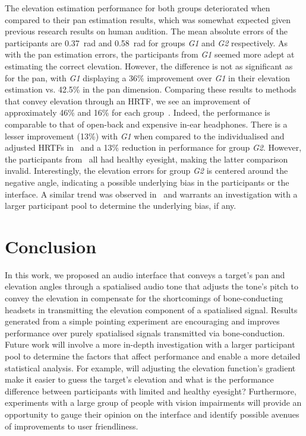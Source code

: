\documentclass{llncs}
\begin{document}
The elevation estimation performance for both groups deteriorated when compared to their pan estimation results, which was somewhat expected given previous research results on human audition. 
The mean absolute errors of the participants are \SI{0.37}{\radian} and \SI{0.58}{\radian} for groups \textit{G1} and \textit{G2} respectively.
As with the pan estimation errors, the participants from \textit{G1} seemed more adept at estimating the correct elevation.
However, the difference is not as significant as for the pan, with \textit{G1} displaying a 36\% improvement over \textit{G1} in their elevation estimation vs. 42.5\% in the pan dimension. 
Comparing these results to methods that convey elevation through an HRTF, we see an improvement of approximately 46\% and 16\% for each group~\cite{schonstein2008comparison}. 
Indeed, the performance is comparable to that of open-back and expensive in-ear headphones.
There is a lesser improvement (13\%) with \textit{G1} when compared to the individualised and adjusted HRTFs in~\cite{stanley2006lateralization} and a 13\% reduction in performance for group \textit{G2}.
However, the participants from~\cite{stanley2006lateralization} all had healthy eyesight, making the latter comparison invalid. 
Interestingly, the elevation errors for group \textit{G2} is centered around the negative angle, indicating a possible underlying bias in the participants or the interface.
A similar trend was observed in~\cite{stanley2006lateralization} and warrants an investigation with a larger participant pool to determine the underlying bias, if any. 

\section{Conclusion}\label{sec:conclusion}

In this work, we proposed an audio interface that conveys a target's pan and elevation angles through a spatialised audio tone that adjusts the tone's pitch to convey the elevation in compensate for the shortcomings of bone-conducting headsets in transmitting the elevation component of a spatialised signal.
Results generated from a simple pointing experiment are encouraging and improves performance over purely spatialised signals transmitted via bone-conduction.
Future work will involve a more in-depth investigation with a larger participant pool to determine the factors that affect performance and enable a more detailed statistical analysis.
For example, will adjusting the elevation function's gradient make it easier to guess the target's elevation and what is the performance difference between participants with limited and healthy eyesight?  
Furthermore, experiments with a large group of people with vision impairments will provide an opportunity to gauge their opinion on the interface and identify possible avenues of improvements to user friendliness.
\end{document}
